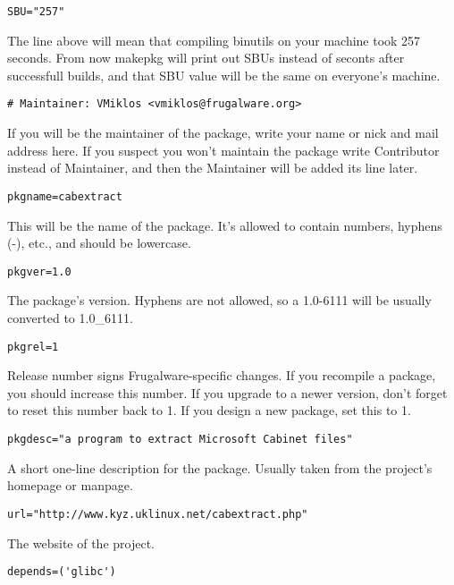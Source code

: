 \begin{verbatim}
SBU="257"
\end{verbatim}

The line above will mean that compiling binutils on your machine took 257
seconds. From now makepkg will print out SBUs instead of seconts after
successfull builds, and that SBU value will be the same on everyone's machine.

\begin{verbatim}
# Maintainer: VMiklos <vmiklos@frugalware.org>
\end{verbatim}

If you will be the maintainer of the package, write your name or nick and mail
address here. If you suspect you won't maintain the package write Contributor
instead of Maintainer, and then the Maintainer will be added its line later.

\begin{verbatim}
pkgname=cabextract
\end{verbatim}

This will be the name of the package. It's allowed to contain numbers, hyphens
(-), etc., and should be lowercase.

\begin{verbatim}
pkgver=1.0
\end{verbatim}

The package's version. Hyphens are not allowed, so a 1.0-6111 will be usually converted to 1.0\_6111.

\begin{verbatim}
pkgrel=1
\end{verbatim}

Release number signs Frugalware-specific changes. If you recompile a package,
you should increase this number. If you upgrade to a newer version, don't
forget to reset this number back to 1. If you design a new package, set this to
1.

\begin{verbatim}
pkgdesc="a program to extract Microsoft Cabinet files"
\end{verbatim}

A short one-line description for the package. Usually taken from the project's
homepage or manpage.

\begin{verbatim}
url="http://www.kyz.uklinux.net/cabextract.php"
\end{verbatim}

The website of the project.

\begin{verbatim}
depends=('glibc')
\end{verbatim}

